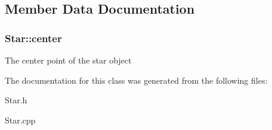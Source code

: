 \subsection{Member Data Documentation}
\hypertarget{class_star_a56595bbf2da9c7b2de04be76f61d2e93}{
\subsubsection[{center}]{ Star\+::center}}\label{class_star_a56595bbf2da9c7b2de04be76f61d2e93}
The center point of the star object 

The documentation for this class was generated from the following files\+:\begin{DoxyCompactItemize}
\item 
Star.\+h\item 
Star.\+cpp\end{DoxyCompactItemize}
